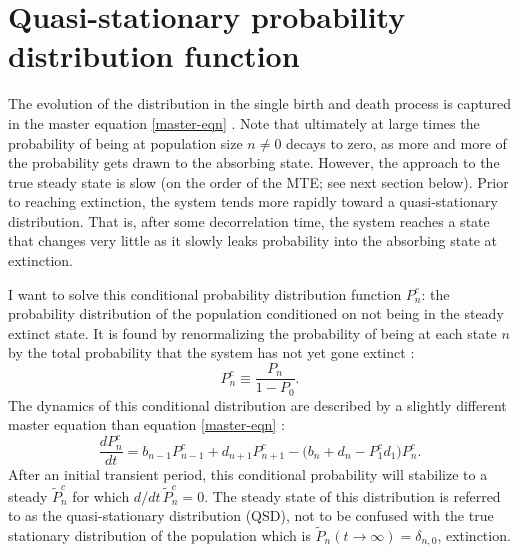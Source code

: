\section{Quasi-stationary probability distribution function}%

The evolution of the distribution in the single birth and death process is captured in the master equation \ref{master-eqn} \cite{Nisbet1982,Gardiner2004}. 
Note that ultimately at large times the probability of being at population size $n\neq 0$ decays to zero, as more and more of the probability gets drawn to the absorbing state. 
However, the approach to the true steady state is slow (on the order of the MTE; see next section below). 
Prior to reaching extinction, the system tends more rapidly toward a quasi-stationary distribution. 
That is, after some decorrelation time, the system reaches a state that changes very little as it slowly leaks probability into the absorbing state at extinction. 

I want to solve this conditional probability distribution function $P_n^c$: the probability distribution of the population conditioned on not being in the steady extinct state. 
It is found by renormalizing the probability of being at each state $n$ by the total probability that the system has not yet gone extinct \cite{Nisbet1982}:
\begin{equation}
 P_n^c \equiv \frac{P_n}{1-P_0}.
\end{equation}
The dynamics of this conditional distribution are described by a slightly different master equation than equation \ref{master-eqn} \cite{Nisbet1982}:
\begin{equation}
\frac{dP_n^c}{dt} =  b_{n-1}P_{n-1}^c + d_{n+1}P_{n+1}^c - \big(b_n + d_n - P_1^c d_1 \big) P_n^c. 
\label{masters2}
\end{equation}
After an initial transient period, this conditional probability will stabilize to a steady $\tilde{P}^c_n$ for which $d/dt\,\tilde{P}_n^c=0$. 
The steady state of this distribution is referred to as the quasi-stationary distribution (QSD), not to be confused with the true stationary distribution of the population which is $\tilde{P}_n(t\rightarrow\infty)=\delta_{n,0}$, extinction. 

